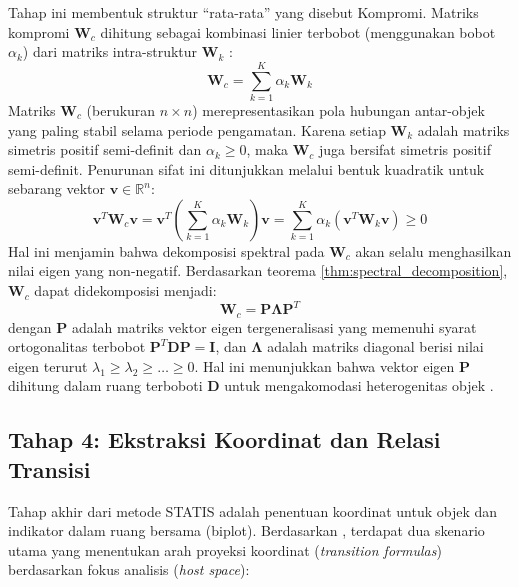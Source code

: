 Tahap ini membentuk struktur ``rata-rata'' yang disebut Kompromi. Matriks kompromi $\mathbf{W}_c$ dihitung sebagai kombinasi linier terbobot (menggunakan bobot $\alpha_k$) dari matriks intra-struktur $\mathbf{W}_k$ \citep{lavit94}:
\begin{equation}\label{eq:wc}
  \mathbf{W}_c = \sum_{k=1}^{K} \alpha_k \mathbf{W}_k
\end{equation}
Matriks $\mathbf{W}_c$ (berukuran $n \times n$) merepresentasikan pola hubungan antar-objek yang paling stabil selama periode pengamatan. Karena setiap $\mathbf{W}_k$ adalah matriks simetris positif semi-definit dan $\alpha_k \ge 0$, maka $\mathbf{W}_c$ juga bersifat simetris positif semi-definit. Penurunan sifat ini ditunjukkan melalui bentuk kuadratik untuk sebarang vektor $\mathbf{v} \in \mathbb{R}^n$:
\begin{equation}
    \mathbf{v}^T \mathbf{W}_c \mathbf{v} = \mathbf{v}^T \left( \sum_{k=1}^K \alpha_k \mathbf{W}_k \right) \mathbf{v} = \sum_{k=1}^K \alpha_k (\mathbf{v}^T \mathbf{W}_k \mathbf{v}) \ge 0
\end{equation}
Hal ini menjamin bahwa dekomposisi spektral pada $\mathbf{W}_c$ akan selalu menghasilkan nilai eigen yang non-negatif. Berdasarkan teorema \ref{thm:spectral_decomposition}, $\mathbf{W}_c$ dapat didekomposisi menjadi:
\begin{equation}\label{eq:decomp_W}
    \mathbf{W}_c = \mathbf{P} \mathbf{\Lambda} \mathbf{P}^T
\end{equation}
dengan $\mathbf{P}$ adalah matriks vektor eigen tergeneralisasi yang memenuhi syarat ortogonalitas terbobot $\mathbf{P}^T \mathbf{D} \mathbf{P} = \mathbf{I}$, dan $\mathbf{\Lambda}$ adalah matriks diagonal berisi nilai eigen terurut $\lambda_1 \ge \lambda_2 \ge \dots \ge 0$. Hal ini menunjukkan bahwa vektor eigen $\mathbf{P}$ dihitung dalam ruang terboboti $\mathbf{D}$ untuk mengakomodasi heterogenitas objek \citep{lavit94}.
\subsection{\normalsize Tahap 4: Ekstraksi Koordinat dan Relasi Transisi}

Tahap akhir dari metode STATIS adalah penentuan koordinat untuk objek dan indikator dalam ruang bersama (biplot). Berdasarkan \citet{abdi2012}, terdapat dua skenario utama yang menentukan arah proyeksi koordinat (\textit{transition formulas}) berdasarkan fokus analisis (\textit{host space}):

